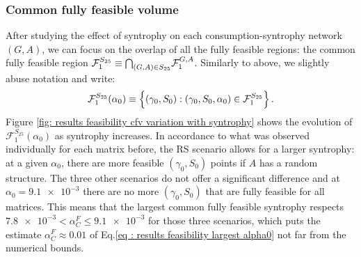\documentclass[12pt, titlepage]{report}
\begin{document}
  \subsubsection{Common fully feasible volume}
 After studying the effect of syntrophy on each consumption-syntrophy network $(G,A)$, we can focus on the overlap of all the fully feasible regions: the common fully feasible region $\mathcal{F}_1^{S_{25}}\equiv {\bigcap}_{(G,A)\in S_{25}} \mathcal{F}^{G,A}_1$. Similarly to above, we slightly abuse notation and write:
\begin{equation}
\mathcal{F}_1^{S_{25}}(\alpha_0) \equiv \left\{(\gamma_0, S_0) : (\gamma_0, S_0, \alpha_0) \in \mathcal{F}_1^{S_{25}}\right\}.
\end{equation}
 Figure \ref{fig: results feasibility cfv variation with syntrophy} shows the evolution of $\mathcal{F}_1^{S_{25}}(\alpha_0)$ as syntrophy increases. %
 In accordance to what was observed individually for each matrix before, the RS scenario allows for a larger syntrophy: at a given $\alpha_0$, there are more feasible $(\gamma_0, S_0)$ points if $A$ has a random structure. The three other scenarios do not offer a significant difference and at $\alpha_0=\num{9.1e-3}$ there are no more $(\gamma_0, S_0)$ that are fully feasible for all matrices. This means that the largest common fully feasible syntrophy respects $\num{7.8e-3}<\alpha_C^F \leq \num{9.1e-3}$ for those three scenarios, which puts the estimate $\alpha_C^F \approx 0.01$ of Eq.\eqref{eq : results feasibility largest alpha0} not far from the numerical bounds.
\end{document}
